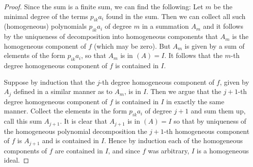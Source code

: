 \documentclass[11pt]{article}
\begin{document}
\begin{enumerate}
\begin{proof}
      Since the sum is a finite sum, we can find the following: Let $m$ be the minimal degree of the terms $p_{ik}a_i$ found in the sum. Then we can collect all such (homogeneous) polynomials $p_{ik}a_i$ of degree $m$ in a summation $A_m$ and it follows by the uniqueness of decomposition into homogeneous components that $A_m$ is the homogeneous component of $f$ (which may be zero). But $A_m$ is given by a sum of elements of the form $p_{ik}a_i$, so that $A_m$ is in $(A) = I$. It follows that the $m$-th degree homogeneous component of $f$ is contained in $I$.
      
      Suppose by induction that the $j$-th degree homogeneous component of $f$, given by $A_j$ defined in a similar manner as to $A_m$, is in $I$. Then we argue that the $j+1$-th degree homogeneous component of $f$ is contained in $I$ in exactly the same manner. Collect the elements in the form $p_{ik}a_i$ of degree $j+1$ and sum them up, call this sum $A_{j+1}$. It is clear that $A_{j+1}$ is in $(A) = I$ so that by uniqueness of the homogeneous polynomial decomposition the $j+1$-th homogeneous component of $f$ is $A_{j+1}$ and is contained in $I$. Hence by induction each of the homogeneous components of $f$ are contained in $I$, and since $f$ was arbitrary, $I$ is a homogeneous ideal.
    \end{proof}
\end{enumerate}
\end{document}
